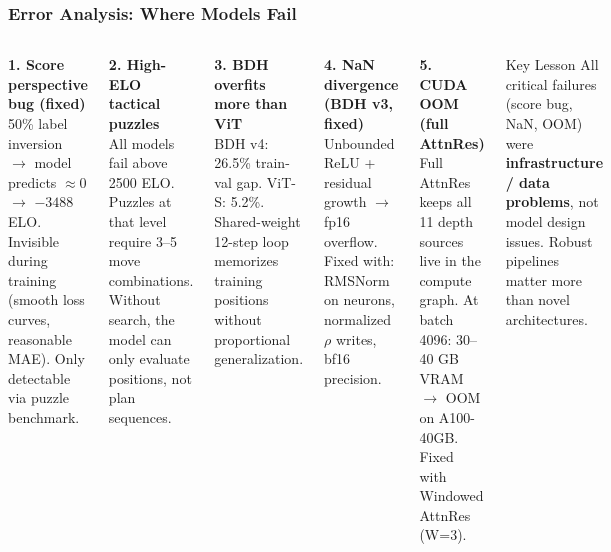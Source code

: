 \documentclass{beamer}
\begin{document}
\begin{frame}
\frametitle{Error Analysis: Where Models Fail}

\begin{columns}

\textbf{1. Score perspective bug (fixed)}\\
{\footnotesize 50\% label inversion $\to$ model predicts $\approx 0$ $\to$ $-3488$ ELO. Invisible during training (smooth loss curves, reasonable MAE). Only detectable via puzzle benchmark.}

\vspace{0.5em}
\textbf{2. High-ELO tactical puzzles}\\
{\footnotesize All models fail above 2500 ELO. Puzzles at that level require 3--5 move combinations. Without search, the model can only evaluate positions, not plan sequences.}

\vspace{0.5em}
\textbf{3. BDH overfits more than ViT}\\
{\footnotesize BDH v4: 26.5\% train-val gap. ViT-S: 5.2\%. Shared-weight 12-step loop memorizes training positions without proportional generalization.}


\textbf{4. NaN divergence (BDH v3, fixed)}\\
{\footnotesize Unbounded ReLU + residual growth $\to$ fp16 overflow. Fixed with: RMSNorm on neurons, normalized $\rho$ writes, bf16 precision.}

\vspace{0.5em}
\textbf{5. CUDA OOM (full AttnRes)}\\
{\footnotesize Full AttnRes keeps all 11 depth sources live in the compute graph. At batch 4096: 30--40 GB VRAM $\to$ OOM on A100-40GB. Fixed with Windowed AttnRes (W=3).}

\vspace{0.5em}
\begin{alertblock}{Key Lesson}
\footnotesize
All critical failures (score bug, NaN, OOM) were \textbf{infrastructure / data problems}, not model design issues. Robust pipelines matter more than novel architectures.
\end{alertblock}

\end{columns}

\end{frame}
\end{document}
